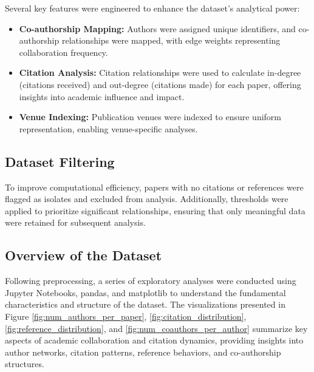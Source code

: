 \documentclass[11pt]{article}
\begin{document}
Several key features were engineered to enhance the dataset's analytical power:

\begin{itemize}
	\item \textbf{Co-authorship Mapping:} Authors were assigned unique identifiers, and co-authorship relationships were mapped, with edge weights representing collaboration frequency.
	\item \textbf{Citation Analysis:} Citation relationships were used to calculate in-degree (citations received) and out-degree (citations made) for each paper, offering insights into academic influence and impact.
	\item \textbf{Venue Indexing:} Publication venues were indexed to ensure uniform representation, enabling venue-specific analyses.
\end{itemize}

\subsection{Dataset Filtering}

To improve computational efficiency, papers with no citations or references were flagged as isolates and excluded from analysis. Additionally, thresholds were applied to prioritize significant relationships, ensuring that only meaningful data were retained for subsequent analysis.

\subsection{Overview of the Dataset}

Following preprocessing, a series of exploratory analyses were conducted using Jupyter Notebooks, pandas, and matplotlib to understand the fundamental characteristics and structure of the dataset. The visualizations presented in Figure \ref{fig:num_authors_per_paper}, \ref{fig:citation_distribution}, \ref{fig:reference_distribution}, and \ref{fig:num_coauthors_per_author} summarize key aspects of academic collaboration and citation dynamics, providing insights into author networks, citation patterns, reference behaviors, and co-authorship structures.
\end{document}
